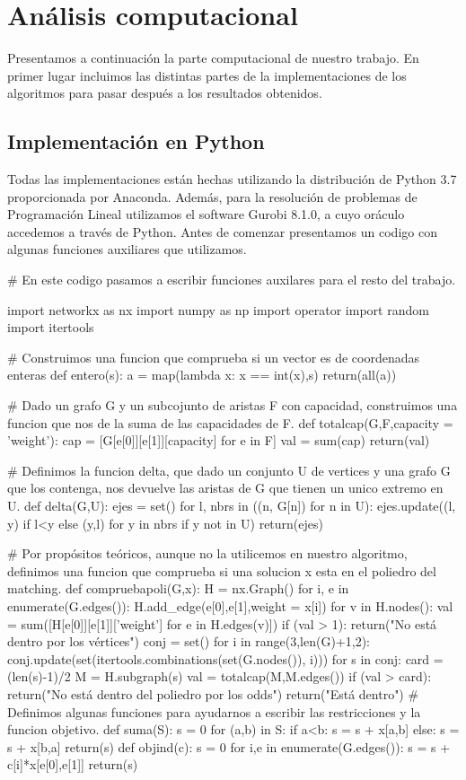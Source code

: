 \documentclass[twoside,a4paper,openright,12pt]{book}
\begin{document}
\chapter{Análisis computacional}
Presentamos a continuación la parte computacional de nuestro trabajo. En primer lugar incluimos las distintas partes de la implementaciones de los algoritmos para pasar después a los resultados obtenidos.
\section{Implementación en Python}
Todas las implementaciones están hechas utilizando la distribución de Python 3.7 proporcionada por Anaconda. Además, para la resolución de problemas de Programación Lineal utilizamos el software Gurobi 8.1.0, a cuyo oráculo accedemos a través de Python. Antes de comenzar presentamos un codigo con algunas funciones auxiliares que utilizamos.
\begin{pythone}
# En este codigo pasamos a escribir funciones auxilares para el resto del trabajo.

import networkx as nx
import numpy as np
import operator
import random 
import itertools

# Construimos una funcion que comprueba si un vector es de coordenadas enteras
def entero(s):
    a = map(lambda x: x == int(x),s)
    return(all(a))
    
# Dado un grafo G y un subcojunto de aristas F con capacidad, construimos una funcion que nos de la suma de las capacidades de F.
def totalcap(G,F,capacity = 'weight'):
    cap = [G[e[0]][e[1]][capacity] for e in F]
    val = sum(cap)
    return(val)

# Definimos la funcion delta, que dado un conjunto U de vertices y una grafo G que los contenga, nos devuelve las aristas de G que tienen un unico extremo en U.
def delta(G,U):
    ejes = set()
    for l, nbrs in ((n, G[n]) for n in U):
        ejes.update((l, y) if l<y else (y,l) for y in nbrs if y not in U)
    return(ejes)
    
# Por propósitos teóricos, aunque no la utilicemos en nuestro algoritmo, definimos una funcion que comprueba si una solucion x esta en el poliedro del matching.
def compruebapoli(G,x):
    H = nx.Graph()
    for i, e in enumerate(G.edges()):
        H.add_edge(e[0],e[1],weight = x[i])
    for v in H.nodes():
        val = sum([H[e[0]][e[1]]['weight'] for e in H.edges(v)])
        if (val > 1):
            return("No está dentro por los vértices") 
    conj = set()
    for i in range(3,len(G)+1,2):
        conj.update(set(itertools.combinations(set(G.nodes()), i)))
    for s in conj:
        card = (len(s)-1)/2
        M = H.subgraph(s)
        val = totalcap(M,M.edges())
        if (val > card):
            return("No está dentro del poliedro por los odds")
    return("Está dentro")
# Definimos algunas funciones para ayudarnos a escribir las restricciones y la funcion objetivo.
def suma(S):
	s = 0
    for (a,b) in S:
        if a<b:
            s = s + x[a,b]
		else:
            s = s + x[b,a]
        return(s)
def objind(c):
    s = 0
	for i,e in enumerate(G.edges()):
    	s = s + c[i]*x[e[0],e[1]] 
    return(s)
\end{pythone}
\end{document}
